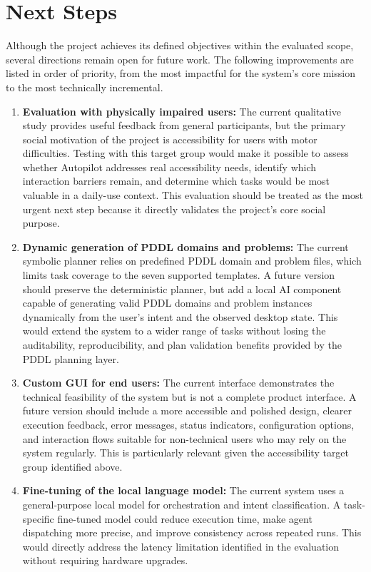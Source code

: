 \section{Next Steps}

Although the project achieves its defined objectives within the evaluated scope, several directions remain open for future work. The following improvements are listed in order of priority, from the most impactful for the system's core mission to the most technically incremental.

\begin{enumerate}

  \item \textbf{Evaluation with physically impaired users:} The current qualitative study provides useful feedback from general participants, but the primary social motivation of the project is accessibility for users with motor difficulties. Testing with this target group would make it possible to assess whether Autopilot addresses real accessibility needs, identify which interaction barriers remain, and determine which tasks would be most valuable in a daily-use context. This evaluation should be treated as the most urgent next step because it directly validates the project's core social purpose.

  \item \textbf{Dynamic generation of PDDL domains and problems:} The current symbolic planner relies on predefined PDDL domain and problem files, which limits task coverage to the seven supported templates. A future version should preserve the deterministic planner, but add a local AI component capable of generating valid PDDL domains and problem instances dynamically from the user's intent and the observed desktop state. This would extend the system to a wider range of tasks without losing the auditability, reproducibility, and plan validation benefits provided by the PDDL planning layer.

  \item \textbf{Custom GUI for end users:} The current interface demonstrates the technical feasibility of the system but is not a complete product interface. A future version should include a more accessible and polished design, clearer execution feedback, error messages, status indicators, configuration options, and interaction flows suitable for non-technical users who may rely on the system regularly. This is particularly relevant given the accessibility target group identified above.

  \item \textbf{Fine-tuning of the local language model:} The current system uses a general-purpose local model for orchestration and intent classification. A task-specific fine-tuned model could reduce execution time, make agent dispatching more precise, and improve consistency across repeated runs. This would directly address the latency limitation identified in the evaluation without requiring hardware upgrades.


\end{enumerate}
